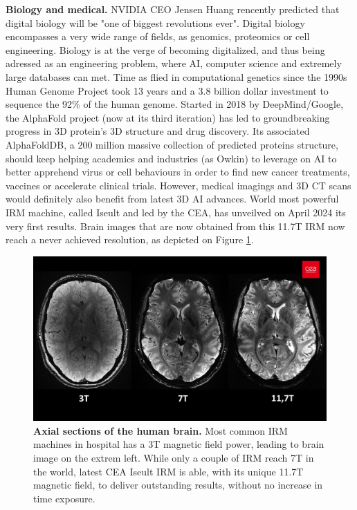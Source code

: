 \noindent \textbf{Biology and medical.} NVIDIA CEO Jensen Huang rencently predicted that digital biology will be "one of biggest revolutions ever". Digital biology encompasses a very wide range of fields, as genomics, proteomics or cell engineering. Biology is at the verge of becoming digitalized, and thus being adressed as an engineering problem, where \ac{AI}, computer science and extremely large databases can met. Time as flied in computational genetics since the 1990s Human Genome Project took 13 years and a 3.8 billion dollar investment to sequence the 92\% of the human genome. Started in 2018 by DeepMind/Google, the AlphaFold project (now at its third iteration) has led to groundbreaking progress in 3D protein's 3D structure and drug discovery. Its associated AlphaFoldDB, a 200 million massive collection of predicted proteins structure, should keep helping academics and industries (as Owkin) to leverage on \ac{AI} to better apprehend virus or cell behaviours in order to find new cancer treatments, vaccines or accelerate clinical trials. However, medical imagings and 3D CT scans would definitely also benefit from latest 3D \ac{AI} advances. World most powerful IRM machine, called Iseult and led by the CEA, has unveilved on April 2024 its very first results. Brain images that are now obtained from this 11.7T IRM now reach a never achieved resolution, as depicted on Figure \ref{fig:conclusion-ceaiseult}.

\begin{figure}[htb!]
  \center
\includegraphics[width=\linewidth]{images/conclusion/cea-iseult.jpg}
\caption{\textbf{Axial sections of the human brain.} Most common IRM machines in hospital has a 3T magnetic field power, leading to brain image on the extrem left. While only a couple of IRM reach 7T in the world, latest CEA Iseult IRM is able, with its unique 11.7T magnetic field, to deliver outstanding results, without no increase in time exposure.}
\label{fig:conclusion-ceaiseult}
\end{figure}


